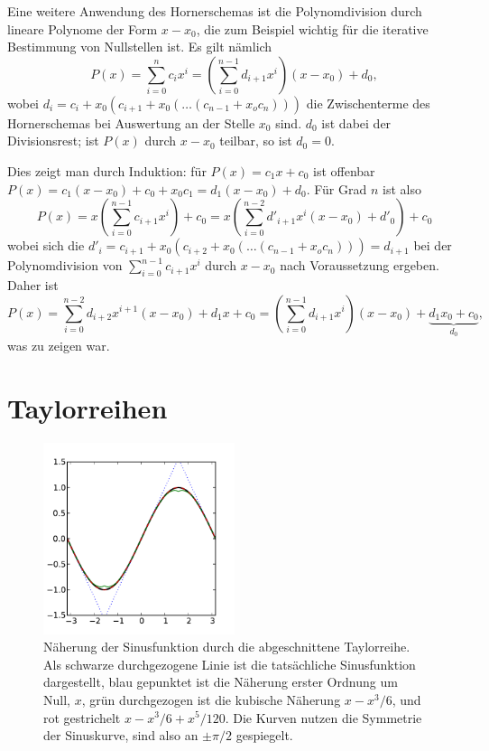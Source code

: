 Eine weitere Anwendung des Hornerschemas ist die Polynomdivision durch
lineare Polynome der Form $x-x_0$, die zum Beispiel wichtig für die
iterative Bestimmung von Nullstellen ist. Es gilt nämlich
\begin{equation}
  \label{eq:polynomdiv}
  P(x) = \sum_{i=0}^{n} c_ix^{i} = 
  \left(\sum_{i=0}^{n-1} d_{i+1}x^{i}\right)(x-x_0) + d_0,
\end{equation}
wobei $d_i = c_i + x_0(c_{i+1} + x_0(\ldots (c_{n-1} + x_o c_n)))$ die
Zwischenterme des Hornerschemas bei Auswertung an der Stelle $x_0$
sind. $d_0$ ist dabei der Divisionsrest; ist $P(x)$ durch $x-x_0$
teilbar, so ist $d_0=0$. 

Dies zeigt man durch Induktion: für $P(x) = c_1 x + c_0$ ist offenbar
$P(x) = c_1(x-x_0) + c_0 + x_0 c_1 = d_1(x-x_0) + d_0$. Für Grad $n$ ist
also
\begin{equation}
    P(x) = x \left(\sum_{i=0}^{n-1} c_{i+1}x^{i}\right) + c_0
    = x\left(\sum_{i=0}^{n-2} d'_{i+1}x^{i}(x-x_0) + d'_0\right) +
    c_0
\end{equation}
wobei sich die $d'_i = c_{i+1} + x_0(c_{i+2} + x_0(\ldots (c_{n-1} +
x_o c_n))) = d_{i+1}$ bei der Polynomdivision von $\sum_{i=0}^{n-1}
c_{i+1}x^{i}$ durch $x-x_0$ nach Voraussetzung ergeben. Daher ist
\begin{equation}
  P(x) = \sum_{i=0}^{n-2} d_{i+2}x^{i+1}(x-x_0) + d_1 x + c_0
  = \left(\sum_{i=0}^{n-1} d_{i+1}x^{i}\right)(x-x_0) +
  \underbrace{d_1 x_0 + c_0}_{d_0},
\end{equation}
was zu zeigen war.

\section{Taylorreihen}

\begin{figure}
  \centering
  \includegraphics[width=0.5\textwidth]{plots/sinus}
  \caption{Näherung der Sinusfunktion durch die abgeschnittene
    Taylorreihe. Als schwarze durchgezogene Linie ist die tatsächliche
    Sinusfunktion dargestellt, blau gepunktet ist die Näherung erster
    Ordnung um Null, $x$, grün durchgezogen ist die kubische Näherung
    $x - x^3/6$, und rot gestrichelt $x-x^3/6 + x^5/120$. Die Kurven
    nutzen die Symmetrie der Sinuskurve, sind also an $\pm\pi/2$
    gespiegelt.}
  \label{fig:sinus}
\end{figure}

